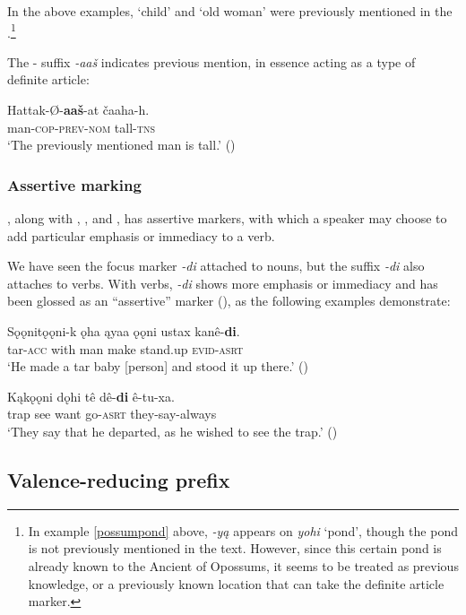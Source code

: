 \documentclass[output=paper]{LSP/langsci}
\begin{document}
In the above examples, `child' and `old woman' were previously mentioned in the .\footnote{In example \ref{possumpond} above, \emph{-yą} appears on \emph{yohi} `pond', though the pond is not previously mentioned in the text. However, since this certain pond is already known to the Ancient of Opossums, it seems to be treated as previous knowledge, or a previously known location that can take the definite article marker.}

	The - suffix \emph{-aaš} indicates previous mention, in essence acting as a type of definite article:

\ea
\gll	Hattak-Ø-\textbf{aaš}-at čaaha-h.\\
	man-\textsc{cop-prev-nom} tall-\textsc{tns} \\
\glt `The previously mentioned man is tall.' 
(\citealt[89]{Broadwell2006})
\z

\subsubsection{Assertive marking}

, along with , , and , has assertive markers, with which a speaker may choose to add particular emphasis or immediacy to a verb. 

	We have seen the  focus marker \emph{-di} attached to nouns, but the suffix \emph{-di} also attaches to verbs. With verbs, \emph{-di} shows more emphasis or immediacy and has been glossed as an “assertive” marker (\citealt[3]{Kaufman2011}), as the following examples demonstrate:

\ea
\gll	Sǫǫnitǫǫni-k ǫha ąyaa ǫǫni ustax kanê-\textbf{di}. \\
	tar-\textsc{acc}  with man make stand.up \textsc{evid-asrt}\\
\glt `He made a tar baby [person] and stood it up there.' (\citealt[13]{DorseySwanton1912})
\z

\ea
\gll	Kąkǫǫni dǫhi tê dê-\textbf{di} ê-tu-xa.\\
	trap 	 see want go-\textsc{asrt} they-say-always\\
\glt `They say that he departed, as he wished to see the trap.' (\citealt[184]{DorseySwanton1912})
\z

\subsection{Valence-reducing prefix}
\end{document}
